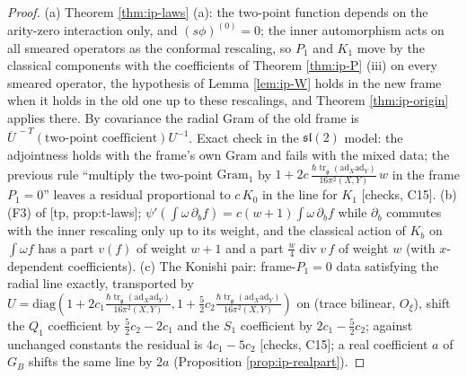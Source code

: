 \documentclass[11pt]{report}
\theoremstyle{plain}
\theoremstyle{definition}
\numberwithin{equation}{chapter}
\newcommand{\unit}{\tfrac{\hbar\operatorname{tr}_{\mathfrak g}(\mathrm{ad}_X\mathrm{ad}_Y)}{16\pi^2(X,Y)}}
\newcommand{\Go}{\mathrm{Gram}_{1}}
\begin{document}
\begin{proof}
(a) Theorem \ref{thm:ip-laws} (a): the two-point function depends on the arity-zero interaction only, and $(s\phi)^{(0)}=0$; the inner automorphism acts on all smeared operators as the conformal rescaling, so $P_1$ and $K_1$ move by the classical components with the coefficients of Theorem \ref{thm:ip-P} (iii) on every smeared operator, the hypothesis of Lemma \ref{lem:ip-W} holds in the new frame when it holds in the old one up to these rescalings, and Theorem \ref{thm:ip-origin} applies there. By covariance the radial Gram of the old frame is $\overline U^{\,-T}(\text{two-point coefficient})U^{-1}$. Exact check in the $\mathfrak{sl}(2)$ model: the adjointness holds with the frame's own Gram and fails with the mixed data; the previous rule ``multiply the two-point $\Go$ by $1+2c\,\unit\,w$ in the frame $P_1=0$'' leaves a residual proportional to $c\,K_0$ in the line for $K_1$ [checks, C15]. (b) (F3) of [tp, prop:t-laws]; $\psi'(\int\omega\,\partial_bf)=c(w+1)\int\omega\,\partial_bf$ while $\partial_b$ commutes with the inner rescaling only up to its weight, and the classical action of $K_b$ on $\int\omega f$ has a part $v(f)$ of weight $w+1$ and a part $\tfrac w4\operatorname{div}v\,f$ of weight $w$ (with $x$-dependent coefficients). (c) The Konishi pair: frame-$P_1=0$ data satisfying the radial line exactly, transported by $U=\mathrm{diag}(1+2c_1\unit,1+\tfrac52c_2\unit)$ on (trace bilinear, $O_\xi$), shift the $Q_1$ coefficient by $\tfrac52c_2-2c_1$ and the $S_1$ coefficient by $2c_1-\tfrac52c_2$; against unchanged constants the residual is $4c_1-5c_2$ [checks, C15]; a real coefficient $a$ of $G_B$ shifts the same line by $2a$ (Proposition \ref{prop:ip-realpart}).
\end{proof}
\end{document}
